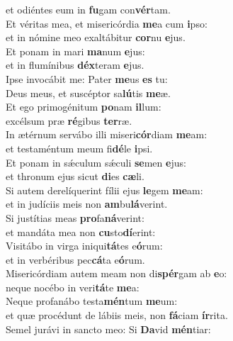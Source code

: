 \oddverse et odiéntes eum in \textbf{fu}gam con\textbf{vér}tam.\\
\evenverse Et véritas mea, et misericórdia \textbf{me}a cum \textbf{i}pso:~\*\\
\evenverse et in nómine meo exaltábitur \textbf{cor}nu \textbf{e}jus.\\
\oddverse Et ponam in mari \textbf{ma}num \textbf{e}jus:~\*\\
\oddverse et in flumínibus \textbf{déx}teram \textbf{e}jus.\\
\evenverse Ipse invocábit me: Pater \textbf{me}us \textbf{es} tu:~\*\\
\evenverse Deus meus, et suscéptor sa\textbf{lú}tis \textbf{me}æ.\\
\oddverse Et ego primogénitum \textbf{po}nam \textbf{il}lum:~\*\\
\oddverse excélsum præ \textbf{ré}gibus \textbf{ter}ræ.\\
\evenverse In ætérnum servábo illi miseri\textbf{cór}diam \textbf{me}am:~\*\\
\evenverse et testaméntum meum fi\textbf{dé}le \textbf{i}psi.\\
\oddverse Et ponam in sǽculum sǽculi \textbf{se}men \textbf{e}jus:~\*\\
\oddverse et thronum ejus sicut \textbf{di}es \textbf{cæ}li.\\
\evenverse Si autem derelíquerint fílii ejus \textbf{le}gem \textbf{me}am:~\*\\
\evenverse et in judíciis meis non \textbf{am}bu\textbf{lá}verint.\\
\oddverse Si justítias meas \textbf{pro}fa\textbf{ná}verint:~\*\\
\oddverse et mandáta mea non \textbf{cu}sto\textbf{dí}erint:\\
\evenverse Visitábo in virga iniqui\textbf{tá}tes e\textbf{ó}rum:~\*\\
\evenverse et in verbéribus pec\textbf{cá}ta e\textbf{ó}rum.\\
\oddverse Misericórdiam autem meam non di\textbf{spér}gam ab \textbf{e}o:~\*\\
\oddverse neque nocébo in veri\textbf{tá}te \textbf{me}a:\\
\evenverse Neque profanábo testa\textbf{mén}tum \textbf{me}um:~\*\\
\evenverse et quæ procédunt de lábiis meis, non \textbf{fá}ciam \textbf{ír}rita.\\
\oddverse Semel jurávi in sancto meo: Si \textbf{Da}vid \textbf{mén}tiar:~\*\\
